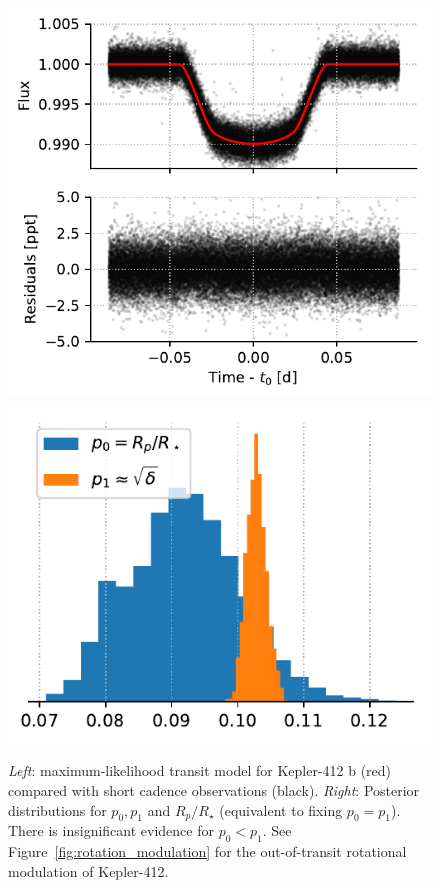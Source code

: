 \begin{figure}%
    \centering
    \includegraphics[scale=0.75]{robin/kepler412_residuals_ld.pdf}
    \includegraphics[scale=0.75]{robin/kepler412_agreement_ld.pdf}
    \caption{\textsl{Left}: maximum-likelihood transit model for Kepler-412 b (red) compared with \kepler short cadence observations (black). \textsl{Right}: Posterior distributions for $p_0,p_1$ and $R_p/R_\star$ (equivalent to fixing $p_0 = p_1$). There is insignificant evidence for $p_0 < p_1$. See Figure~\ref{fig:rotation_modulation} for the out-of-transit rotational modulation of Kepler-412.}
    \label{fig:kepler412}
\end{figure}


